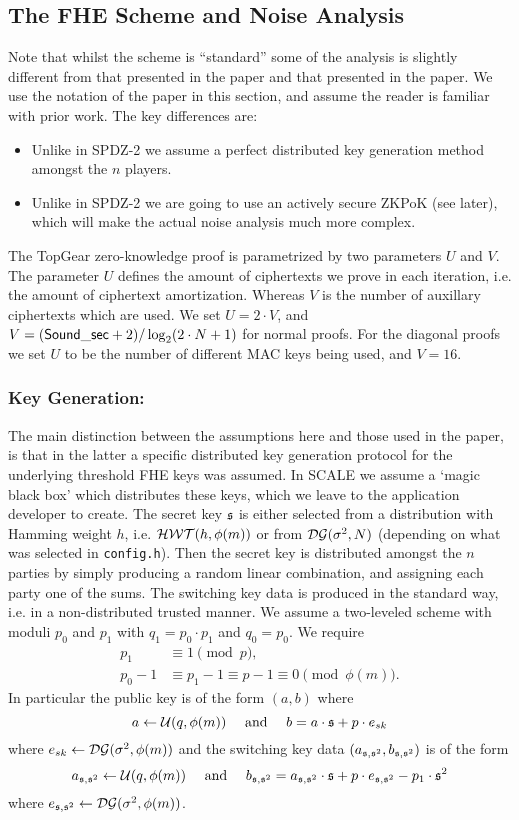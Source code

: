\subsection{The FHE Scheme and Noise Analysis}
Note that whilst the scheme is ``standard'' some of the
analysis is slightly different from that presented in the \cite{SPDZ2} paper 
and that presented in the \cite{GHS12c} paper.
We use the notation of the \cite{SPDZ2} paper in this section,
and assume the reader is familiar with prior work.
The key differences are:
\begin{itemize}
\item Unlike in SPDZ-2 we assume a perfect distributed key generation method
amongst the $n$ players.
\item Unlike in SPDZ-2 we are going to use an actively secure ZKPoK (see later),
which will make the actual noise analysis much more complex.
\end{itemize}
The TopGear zero-knowledge proof is parametrized by two
parameters $U$ and $V$.
The parameter $U$ defines the amount of ciphertexts we prove in
each iteration, i.e. the amount of ciphertext amortization.
Whereas $V$ is the number of auxillary ciphertexts which are used.
We set $U = 2 \cdot V$, and $V= (\mathsf{Sound\_sec}+2)/\log_2 (2 \cdot N+1)$
for normal proofs.
For the diagonal proofs we set $U$ to be the number of different
MAC keys being used, and $V=16$.


\subsubsection{Key Generation:}
The main distinction between the assumptions here and those used in 
the \cite{SPDZ2} paper, is that in the latter a specific distributed 
key generation protocol for the underlying threshold FHE keys was
assumed. In SCALE we assume a `magic black box' which distributes
these keys, which we leave to the application developer to create.
The secret key $\mathfrak{s}$ is either selected from a distribution with
Hamming weight $h$, i.e. $\mathcal{HWT}(h,\phi(m))$ or from
$\mathcal{DG}(\sigma^2,N)$ (depending on what was selected in \verb|config.h|).
Then the secret key is distributed amongst the $n$ parties by simply producing a random 
linear combination, and assigning each party one of the sums.
The switching key data is produced in the standard way, i.e.
in a non-distributed trusted manner.
We assume a two-leveled scheme with moduli $p_0$ and $p_1$ with $q_1=p_0 \cdot p_1$
and $q_0=p_0$.
We require 
\begin{align*}
   p_1 & \equiv 1 \pmod{p}, \\
   p_0 - 1 & \equiv p_1-1 \equiv p-1 \equiv 0 \pmod{\phi(m)}.
\end{align*}
In particular the public key is of the form $(a,b)$ where
\[ a \leftarrow \mathcal{U}(q,\phi(m)) \quad \mbox{ and } \quad b = a \cdot \mathfrak{s} + p \cdot e_{sk} \]
where $e_{sk} \leftarrow \mathcal{DG}(\sigma^2,\phi(m))$ 
and the switching key data $(a_{\mathfrak{s},\mathfrak{s}^2},b_{\mathfrak{s},\mathfrak{s}^2})$ is of the form
\[ a_{\mathfrak{s},\mathfrak{s}^2} \leftarrow \mathcal{U}(q,\phi(m)) \quad \mbox{ and } \quad 
   b_{\mathfrak{s},\mathfrak{s}^2} =   a_{\mathfrak{s},\mathfrak{s}^2} \cdot \mathfrak{s} + p \cdot e_{\mathfrak{s},\mathfrak{s}^2} - p_1 \cdot \mathfrak{s}^2 \]
where $e_{\mathfrak{s},\mathfrak{s}^2} \leftarrow \mathcal{DG}(\sigma^2,\phi(m))$.


